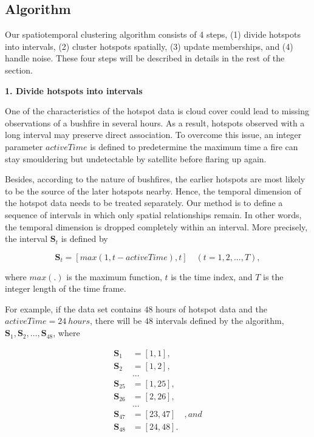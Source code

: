 \hypertarget{algorithm}{%
\subsection{Algorithm}\label{algorithm}}

Our spatiotemporal clustering algorithm consists of 4 steps, (1) divide
hotspots into intervals, (2) cluster hotspots spatially, (3) update
memberships, and (4) handle noise. These four steps will be described in
details in the rest of the section.

\textbf{1. Divide hotspots into intervals}

One of the characteristics of the hotspot data is cloud cover could lead
to missing observations of a bushfire in several hours. As a result,
hotspots observed with a long interval may preserve direct association.
To overcome this issue, an integer parameter \(activeTime\) is defined
to predetermine the maximum time a fire can stay smouldering but
undetectable by satellite before flaring up again.

Besides, according to the nature of bushfires, the earlier hotspots are
most likely to be the source of the later hotspots nearby. Hence, the
temporal dimension of the hotspot data needs to be treated separately.
Our method is to define a sequence of intervals in which only spatial
relationships remain. In other words, the temporal dimension is dropped
completely within an interval. More precisely, the interval
\(\boldsymbol{S}_t\) is defined by

\[\boldsymbol{S}_t = [max(1,t-activeTime),t]\quad(t = 1,2,...,T),\]

where \(max(.)\) is the maximum function, \(t\) is the time index, and
\(T\) is the integer length of the time frame.

For example, if the data set contains \(48\) hours of hotspot data and
the \(activeTime = 24~hours\), there will be \(48\) intervals defined by
the algorithm,
\(\boldsymbol{S}_1,\boldsymbol{S}_2,\ldots,\boldsymbol{S}_{48}\), where

\begin{align*}
\boldsymbol{S}_1 &= [1,1],\\
\boldsymbol{S}_2 &= [1,2],\\
&...\\
\boldsymbol{S}_{25} &= [1,25],\\
\boldsymbol{S}_{26} &= [2,26],\\
&...\\
\boldsymbol{S}_{47} &= [23,47]\quad, and\\
\boldsymbol{S}_{48} &= [24,48].
\end{align*}

